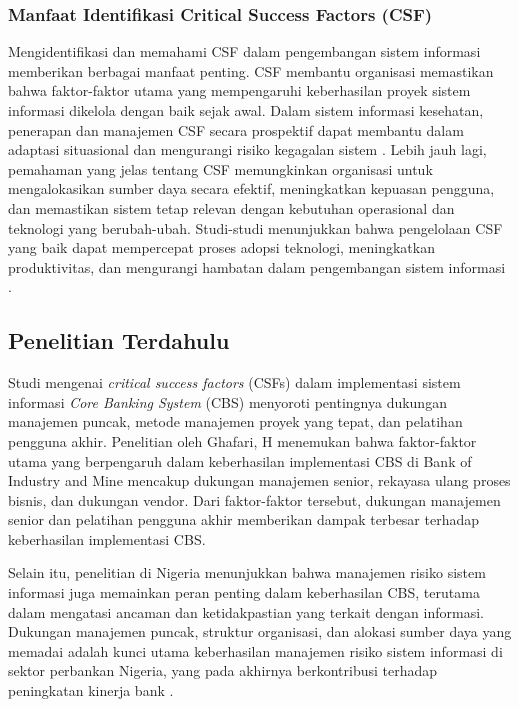 \documentclass[journal,article,submit,pdftex,moreauthors]{Definitions/mdpi}
\begin{document}
\subsubsection{Manfaat Identifikasi Critical Success Factors (CSF)}
Mengidentifikasi dan memahami CSF dalam pengembangan sistem informasi memberikan berbagai manfaat penting. CSF membantu organisasi memastikan bahwa faktor-faktor utama yang mempengaruhi keberhasilan proyek sistem informasi dikelola dengan baik sejak awal. Dalam sistem informasi kesehatan, penerapan dan manajemen CSF secara prospektif dapat membantu dalam adaptasi situasional dan mengurangi risiko kegagalan sistem \cite{aggestam2023apply}. Lebih jauh lagi, pemahaman yang jelas tentang CSF memungkinkan organisasi untuk mengalokasikan sumber daya secara efektif, meningkatkan kepuasan pengguna, dan memastikan sistem tetap relevan dengan kebutuhan operasional dan teknologi yang berubah-ubah. Studi-studi menunjukkan bahwa pengelolaan CSF yang baik dapat mempercepat proses adopsi teknologi, meningkatkan produktivitas, dan mengurangi hambatan dalam pengembangan sistem informasi \cite{jayakody2023devops}.


\subsection{Penelitian Terdahulu} \label{sec:Penelitian Terdahulu}

Studi mengenai \textit{critical success factors} (CSFs) dalam implementasi sistem informasi \textit{Core Banking System} (CBS) menyoroti pentingnya dukungan manajemen puncak, metode manajemen proyek yang tepat, dan pelatihan pengguna akhir. Penelitian oleh Ghafari, H \cite{Ghafari-csf} menemukan bahwa faktor-faktor utama yang berpengaruh dalam keberhasilan implementasi CBS di Bank of Industry and Mine mencakup dukungan manajemen senior, rekayasa ulang proses bisnis, dan dukungan vendor. Dari faktor-faktor tersebut, dukungan manajemen senior dan pelatihan pengguna akhir memberikan dampak terbesar terhadap keberhasilan implementasi CBS.

Selain itu, penelitian di Nigeria menunjukkan bahwa manajemen risiko sistem informasi juga memainkan peran penting dalam keberhasilan CBS, terutama dalam mengatasi ancaman dan ketidakpastian yang terkait dengan informasi. Dukungan manajemen puncak, struktur organisasi, dan alokasi sumber daya yang memadai adalah kunci utama keberhasilan manajemen risiko sistem informasi di sektor perbankan Nigeria, yang pada akhirnya berkontribusi terhadap peningkatan kinerja bank \cite{falisat-csf}.
\end{document}
